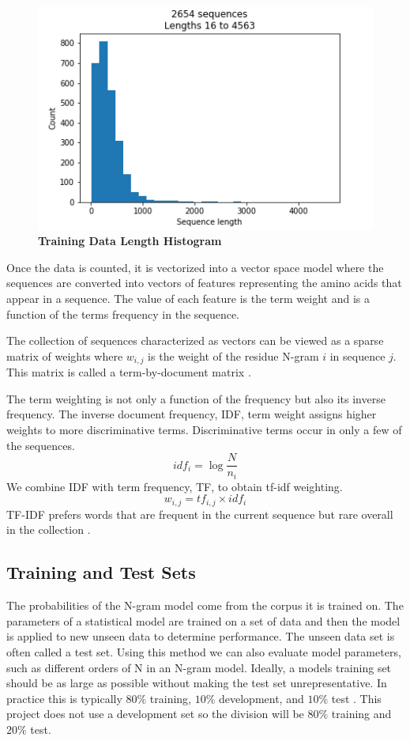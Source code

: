 \documentclass[10pt,letterpaper]{article}
\begin{document}
	\begin{figure}[!h]
		\centering
		\includegraphics[scale=0.5, width=\textwidth]{sequence-hist}
		\caption{{\bf Training Data Length Histogram}}
		\label{fig:sequence-hist}
	\end{figure}
	
	Once the data is counted, it is vectorized into a vector space model where the sequences are converted into vectors of features representing the amino acids that appear in a sequence. The value of each feature is the term weight and is a function of the terms frequency in the sequence.
	
	The collection of sequences characterized as vectors can be viewed as a sparse matrix of weights where $w_{i,j}$ is the weight of the residue N-gram $i$ in sequence $j$. This matrix is called a term-by-document matrix \cite{jurafsky}.  
	
	The term weighting is not only a function of the frequency but also its inverse frequency. The inverse document frequency, IDF, term weight assigns higher weights to more discriminative terms. Discriminative terms occur in only a few of the sequences. 
	$$ idf_i = \log {\frac{N}{n_i}}$$ We combine IDF with term frequency, TF, to obtain tf-idf weighting. $$w_{i,j} = tf_{i,j} \times idf_i$$ TF-IDF prefers words that are frequent in the current sequence but rare overall in the collection \cite{jurafsky}.
	
	\subsection*{Training and Test Sets}
	The probabilities of the N-gram model come from the corpus it is trained on. The parameters of a statistical model are trained on a set of data and then the model is applied to new unseen data to determine performance. The unseen data set is often called a test set. Using this method we can also evaluate model parameters, such as different orders of N in an N-gram model. Ideally, a models training set should be as large as possible without making the test set unrepresentative. In practice this is typically $80\%$ training, $10\%$ development, and $10\%$ test \cite{jurafsky}. This project does not use a development set so the division will be $80\%$ training and $20\%$ test. 
	
\end{document}
